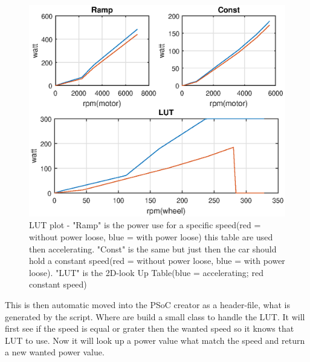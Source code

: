 \begin{figure}[H]
	\centering
	\includegraphics [width=6in]{Software/Pictures/LUT.eps}
	\caption{LUT plot - "Ramp" is the power use for a specific speed(red = without power loose, blue = with power loose) this table are used then accelerating. "Const" is the same but just then the car should hold a constant speed(red = without power loose, blue = with power loose). "LUT" is the 2D-look Up Table(blue = accelerating; red constant speed)}
	\label{fig:LUT_plot}
\end{figure}

This is then automatic moved into the PSoC creator as a header-file, what is generated by the script. Where are build a small class to handle the LUT.
It will first see if the speed is equal or grater then the wanted speed so it knows that LUT to use. Now it will look up a power value what match the speed and return a new wanted power value.



